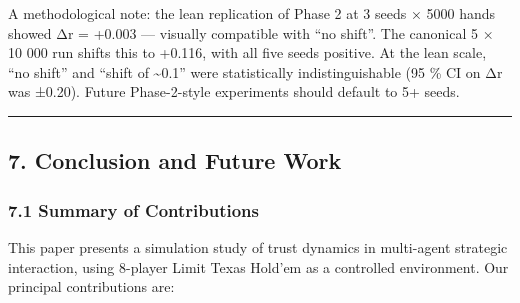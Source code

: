 \documentclass[
]{article}
\begin{document}
A methodological note: the lean replication of Phase 2 at 3 seeds × 5000
hands showed Δr = +0.003 --- visually compatible with ``no shift''. The
canonical 5 × 10 000 run shifts this to +0.116, with all five seeds
positive. At the lean scale, ``no shift'' and ``shift of
\textasciitilde0.1'' were statistically indistinguishable (95 \% CI on
Δr was ±0.20). Future Phase-2-style experiments should default to 5+
seeds.

\begin{center}\rule{0.5\linewidth}{0.5pt}\end{center}

\hypertarget{conclusion-and-future-work}{%
\subsection{7. Conclusion and Future
Work}\label{conclusion-and-future-work}}

\hypertarget{summary-of-contributions-1}{%
\subsubsection{7.1 Summary of
Contributions}\label{summary-of-contributions-1}}

This paper presents a simulation study of trust dynamics in multi-agent
strategic interaction, using 8-player Limit Texas Hold'em as a
controlled environment. Our principal contributions are:
\end{document}

